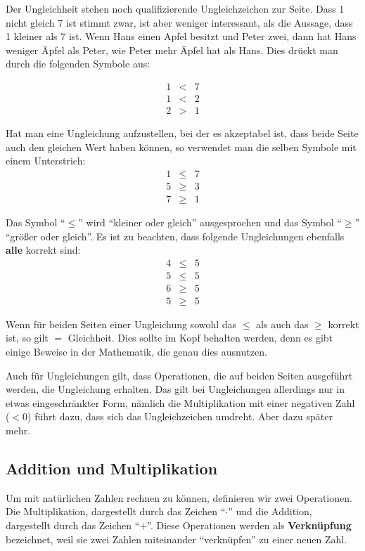 Der Ungleichheit stehen noch qualifizierende Ungleichzeichen zur Seite. Dass 1 nicht gleich 7 ist stimmt zwar, ist aber weniger interessant, als die Aussage, dass 1 kleiner als 7 ist. Wenn Hans einen Apfel besitzt und Peter zwei, dann hat Hans weniger Äpfel als Peter, wie Peter mehr Äpfel hat als Hans. Dies drückt man durch die folgenden Symbole aus:

\begin{eqnarray*}
1 & < & 7 \\
1 & < & 2 \\
2 & > & 1
\end{eqnarray*}

Hat man eine Ungleichung aufzustellen, bei der es akzeptabel ist, dass beide Seite auch den gleichen Wert haben können, so verwendet man die selben Symbole mit einem Unterstrich:
\begin{eqnarray*}
1 & \le & 7 \\
5 & \ge & 3 \\
7 & \ge & 1
\end{eqnarray*}

Das Symbol "`$\le$"' wird "`kleiner oder gleich"' ausgesprochen und das Symbol "`$\ge$"' "`größer oder gleich"'. Es ist zu beachten, dass folgende Ungleichungen ebenfalls \textbf{alle} korrekt sind:
\begin{eqnarray*}
4 & \le & 5 \\
5 & \le & 5 \\
6 & \ge & 5 \\
5 & \ge & 5
\end{eqnarray*}

Wenn für beiden Seiten einer Ungleichung sowohl das $\le$ als auch das $\ge$ korrekt ist, so gilt $=$ Gleichheit. Dies sollte im Kopf behalten werden, denn es gibt einige Beweise in der Mathematik, die genau dies ausnutzen.

Auch für Ungleichungen gilt, dass Operationen, die auf beiden Seiten ausgeführt werden, die Ungleichung erhalten. Das gilt bei Ungleichungen allerdings nur in etwas eingeschränkter Form, nämlich die Multiplikation mit einer negativen Zahl ($<0$) führt dazu, dass sich das Ungleichzeichen umdreht. Aber dazu später mehr.

\subsection{Addition und Multiplikation}

\begin{definition}
Um mit natürlichen Zahlen rechnen zu können, definieren wir zwei Operationen. Die Multiplikation, dargestellt durch das Zeichen "`$\cdot$"' und die Addition, dargestellt durch das Zeichen "`$+$"'. Diese Operationen werden als \textbf{Verknüpfung} bezeichnet, weil sie zwei Zahlen miteinander "`verknüpfen"' zu einer neuen Zahl.
\end{definition}

